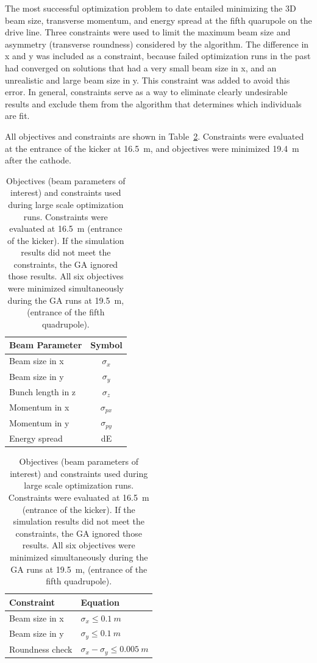 \label{setup}
The most successful optimization problem to date entailed minimizing the 
3D beam size, transverse momentum, and energy spread at the fifth quarupole on the drive line.
Three constraints were used to limit the maximum beam size and asymmetry (transverse roundness) considered by the algorithm.
The difference in x and y was included as a constraint, because failed optimization runs in the 
past had converged on solutions that had a very small beam size in x, and an unrealistic and large 
beam size in y. This constraint was added to avoid this error.
In general, constraints serve as a way to eliminate clearly undesirable results and exclude them 
from the algorithm that determines which individuals are fit.

All objectives and constraints are shown in Table~\ref{tab:opt-tba-obj}. 
Constraints were evaluated at the entrance of the kicker at \SI{16.5}{m}, and
objectives were minimized \SI{19.4}{m} after the cathode. 
\begin{table}%
	\begin{center}
		\caption{Objectives (beam parameters of interest) and constraints used during large scale optimization runs.
		Constraints were evaluated at \SI{16.5}{m} (entrance of the kicker).
		If the simulation results did not meet the constraints, the GA ignored those results.
		All six objectives were minimized simultaneously during the GA runs at \SI{19.5}{m},
		(entrance of the fifth quadrupole).}
		\label{tab:opt-tba-obj}
		\begin{tabular}{lc}
			\toprule
			\toprule
			\textbf{Beam Parameter} 	&  \textbf{Symbol} \\ 
			\midrule
			Beam size in x		&  $\sigma_x$ \\
			Beam size in y		&  $\sigma_y$ \\
			Bunch length in z	&  $\sigma_z$ \\
			Momentum in x		&  $\sigma_{px}$ \\
			Momentum in y		&  $\sigma_{py}$\\ 
			Energy spread 		& dE \\
			\bottomrule
		\end{tabular}\hspace{2em}
		\begin{tabular}{ll}
		\toprule
		\toprule
		\textbf{Constraint} 	&  \textbf{Equation} \\ 
		\midrule
		Beam size in x		&  $\sigma_x \leq \SI{0.1}{m}$ \\
		Beam size in y		&  $\sigma_y \leq \SI{0.1}{m}$  \\
		Roundness check		&  $\sigma_x - \sigma_y \leq \SI{0.005}{m}$ \\
		\bottomrule
	\end{tabular}
	\end{center}
\end{table}
